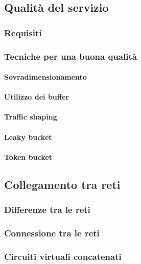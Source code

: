 \subsection{Qualità del servizio}

\subsubsection{Requisiti}

\subsubsection{Tecniche per una buona qualità}

\paragraph{Sovradimensionamento}

\paragraph{Utilizzo dei buffer}

\paragraph{Traffic shaping}

\paragraph{Leaky bucket}

\paragraph{Token bucket}

\subsection{Collegamento tra reti}

\subsubsection{Differenze tra le reti}

\subsubsection{Connessione tra le reti}

\subsubsection{Circuiti virtuali concatenati}

